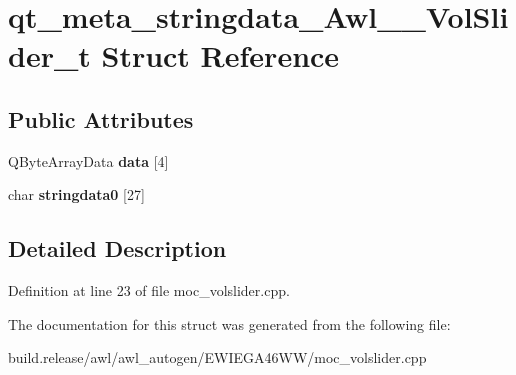 \hypertarget{structqt__meta__stringdata___awl_____vol_slider__t}{}\section{qt\+\_\+meta\+\_\+stringdata\+\_\+\+Awl\+\_\+\+\_\+\+Vol\+Slider\+\_\+t Struct Reference}
\label{structqt__meta__stringdata___awl_____vol_slider__t}
\subsection*{Public Attributes}
\begin{DoxyCompactItemize}
\item 
\mbox{\label{structqt__meta__stringdata___awl_____vol_slider__t_a46d3b29cf85c55b8085f452955ce46c6}} 
Q\+Byte\+Array\+Data {\bfseries data} \mbox{[}4\mbox{]}
\item 
\mbox{\label{structqt__meta__stringdata___awl_____vol_slider__t_a6c8fba3fe1a53837cc6593f075cd333e}} 
char {\bfseries stringdata0} \mbox{[}27\mbox{]}
\end{DoxyCompactItemize}


\subsection{Detailed Description}


Definition at line 23 of file moc\+\_\+volslider.\+cpp.



The documentation for this struct was generated from the following file\+:\begin{DoxyCompactItemize}
\item 
build.\+release/awl/awl\+\_\+autogen/\+E\+W\+I\+E\+G\+A46\+W\+W/moc\+\_\+volslider.\+cpp\end{DoxyCompactItemize}
